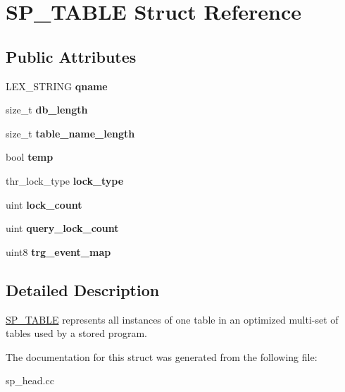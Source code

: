 \hypertarget{structSP__TABLE}{}\section{S\+P\+\_\+\+T\+A\+B\+LE Struct Reference}
\label{structSP__TABLE}
\subsection*{Public Attributes}
\begin{DoxyCompactItemize}
\item 
\mbox{\label{structSP__TABLE_aad9d6e98646d10681c5f7173f5b6931a}} 
L\+E\+X\+\_\+\+S\+T\+R\+I\+NG {\bfseries qname}
\item 
\mbox{\label{structSP__TABLE_a04e8e2d5f4165096b3337b55e3a0b594}} 
size\+\_\+t {\bfseries db\+\_\+length}
\item 
\mbox{\label{structSP__TABLE_a281dc56072d2ce2af4976511f1191105}} 
size\+\_\+t {\bfseries table\+\_\+name\+\_\+length}
\item 
\mbox{\label{structSP__TABLE_ac71735d1c45b46bfd0be632a56035c6e}} 
bool {\bfseries temp}
\item 
\mbox{\label{structSP__TABLE_a2882b826e257ac34fdf66d082cdcbdc3}} 
thr\+\_\+lock\+\_\+type {\bfseries lock\+\_\+type}
\item 
\mbox{\label{structSP__TABLE_a8652c777f1d97f55d348a92158989368}} 
uint {\bfseries lock\+\_\+count}
\item 
\mbox{\label{structSP__TABLE_a7747d0adfd2ce06ff3ce9b0bb6045b57}} 
uint {\bfseries query\+\_\+lock\+\_\+count}
\item 
\mbox{\label{structSP__TABLE_a6db181621e6d4c463cdf5b013df033fa}} 
uint8 {\bfseries trg\+\_\+event\+\_\+map}
\end{DoxyCompactItemize}


\subsection{Detailed Description}
\mbox{\hyperlink{structSP__TABLE}{S\+P\+\_\+\+T\+A\+B\+LE}} represents all instances of one table in an optimized multi-\/set of tables used by a stored program. 

The documentation for this struct was generated from the following file\+:\begin{DoxyCompactItemize}
\item 
sp\+\_\+head.\+cc\end{DoxyCompactItemize}
